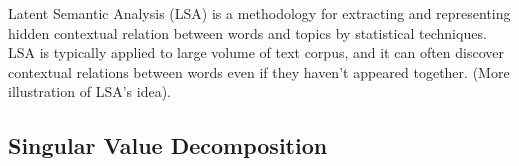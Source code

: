 Latent Semantic Analysis (LSA) is a methodology for extracting and representing hidden contextual relation between words and topics by statistical techniques\cite{landauer1998introduction}. LSA is typically applied to large volume of text corpus, and it can often discover contextual relations between words even if they haven't appeared together. (More illustration of LSA's idea). 

\subsection{Singular Value Decomposition}
